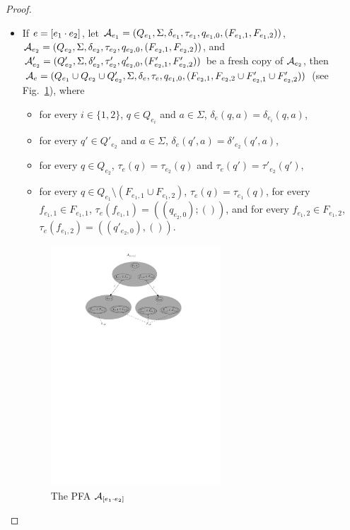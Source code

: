 \begin{proof}
\begin{itemize}
        \item If $e = [e_1 \cdot e_2]$, let $\mathcal{A}_{e_1} = (Q_{e_1},
            \Sigma, \delta_{e_1}, \tau_{e_1}, q_{e_1,0}, (F_{e_1,1}, F_{e_1,2}))$, $\mathcal{A}_{e_2} = (Q_{e_2}, \Sigma,
            \delta_{e_2}, \tau_{e_2}, q_{e_2,0}, (F_{e_2, 1}, F_{e_2,2}))$, and $\mathcal{A}'_{e_2} = (Q'_{e_2}, \Sigma,
            \delta'_{e_2}, \tau'_{e_2}, q'_{e_2,0}, (F'_{e_2, 1}, F'_{e_2,2}))$ be a fresh copy of $\mathcal{A}_{e_2}$, then 
            $\mathcal{A}_e = ( Q_{e_1} \cup Q_{e_2} \cup Q'_{e_2}, \Sigma, \delta_e, \tau_e, q_{e_1,0},
            (F_{e_2,1}, F_{e_2,2} \cup F'_{e_2,1} \cup F'_{e_2,2}))$ (see Fig.~\ref{fig-reg2pfa-2}), where 
            \begin{itemize}
                \item for every $i \in \{1,2\}$, $q \in Q_{e_i}$ and $a \in \Sigma$, $\delta_e(q, a) = \delta_{e_i}(q, a)$,
                \item for every $q' \in Q'_{e_2}$ and $a \in \Sigma$, $\delta_e(q', a) = \delta'_{e_2}(q',a)$, 
                \item for every $q \in Q_{e_2}$, $\tau_e(q) = \tau_{e_2}(q)$ and $\tau_e(q') = \tau'_{e_2}(q')$, 
                \item for every $q \in Q_{e_1} \setminus (F_{e_1,1} \cup F_{e_1,2})$, $\tau_e(q) = \tau_{e_1}(q)$, for every $f_{e_1,1} \in F_{e_1,1}$, $\tau_e(f_{e_1,1}) = ((q_{e_2,0}); ())$, and for every $f_{e_1,2} \in F_{e_1,2}$, $\tau_e(f_{e_1,2}) = ((q'_{e_2,0}), ())$.
            \end{itemize}
            \begin{figure}[ht]
                \centering
                \includegraphics[width = 0.6\textwidth]{reg2pfa-2.pdf}
                \caption{The PFA $\mathcal{A}_{[e_1\cdot e_2]}$}
                \label{fig-reg2pfa-2}
            \end{figure}  


\end{itemize}
\end{proof}
